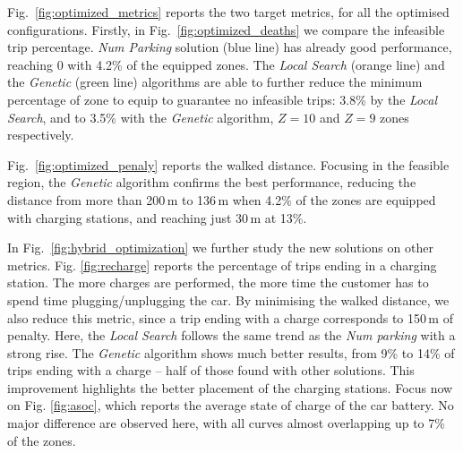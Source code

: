 Fig.~\ref{fig:optimized_metrics} reports the two target metrics, for all the optimised configurations.
Firstly, in Fig.~\ref{fig:optimized_deaths} we compare the infeasible trip percentage. \textit{Num Parking} solution (blue line) has already good performance, reaching 0 with 4.2\% of the equipped zones. 
The \textit{Local Search} (orange line) and the \textit{Genetic} (green line) algorithms are able to further reduce the minimum percentage of zone to equip to guarantee no infeasible trips: 3.8\% by the \textit{Local Search}, and to 3.5\% with the \textit{Genetic} algorithm, $Z=10$ and $Z=9$ zones respectively.

Fig.~\ref{fig:optimized_penaly} reports the walked distance. Focusing in the feasible region, the \textit{Genetic} algorithm confirms the best performance, reducing the distance from more than 200\,m to 136\,m when 4.2\% of the zones are equipped with charging stations, and reaching just 30\,m at 13\%. 




In Fig.~\ref{fig:hybrid_optimization} we further study the new solutions on other metrics.
Fig. \ref{fig:recharge} reports the percentage of trips ending in a charging station. The more charges are performed, the more time the customer has to spend time plugging/unplugging the car. By minimising the walked distance, we also reduce this metric, since a trip ending with a charge corresponds to 150\,m of penalty.
Here, the \textit{Local Search} follows the same trend as the \textit{Num parking} with a strong rise. The \textit{Genetic} algorithm shows much better results, from 9\% to 14\% of trips ending with a charge -- half of those found with other solutions. 
This improvement highlights the better placement of the charging stations.
Focus now on Fig. \ref{fig:asoc}, which reports the average state of charge of the car battery. 
No major difference are observed here, with all curves almost overlapping up to 7\% of the zones.

